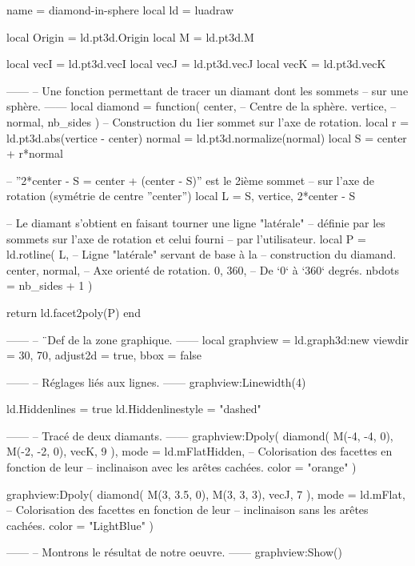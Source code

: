 \documentclass[border = 3pt]{standalone}
\begin{document}
\begin{luadraw*}{name = diamond-in-sphere}
local ld = luadraw

local Origin = ld.pt3d.Origin
local M      = ld.pt3d.M

local vecI = ld.pt3d.vecI
local vecJ = ld.pt3d.vecJ
local vecK = ld.pt3d.vecK

------
-- Une fonction permettant de tracer un diamant dont les sommets
-- sur une sphère.
------
local diamond = function(
  center,   -- Centre de la sphère.
  vertice,  --
  normal,
  nb_sides
)
-- Construction du 1ier sommet sur l'axe de rotation.
  local r = ld.pt3d.abs(vertice - center)
  normal  = ld.pt3d.normalize(normal)
  local S = center + r*normal

-- ''2*center - S = center + (center - S)'' est le 2ième sommet
-- sur l'axe de rotation (symétrie de centre ''center'')
  local L = {S, vertice, 2*center - S}

-- Le diamant s'obtient en faisant tourner une ligne "latérale"
-- définie par les sommets sur l'axe de rotation et celui fourni
-- par l'utilisateur.
  local P = ld.rotline(
    L,                 -- Ligne "latérale" servant de base à la
                       -- construction du diamand.
    {center, normal},  -- Axe orienté de rotation.
    0, 360,            -- De `0` à `360` degrés.
    {nbdots = nb_sides + 1}
  )

  return ld.facet2poly(P)
end

------
-- ¨Def de la zone graphique.
------
local graphview = ld.graph3d:new{
  viewdir  = {30, 70},
  adjust2d = true,
  bbox     = false
}

------
-- Réglages liés aux lignes.
------
graphview:Linewidth(4)

ld.Hiddenlines     = true
ld.Hiddenlinestyle = "dashed"

------
-- Tracé de deux diamants.
------
graphview:Dpoly(
  diamond(
    M(-4, -4, 0), M(-2, -2, 0), vecK,
    9
  ),
  {
    mode  = ld.mFlatHidden,  -- Colorisation des facettes en fonction de leur
                             -- inclinaison avec les arêtes cachées.
    color = "orange"
  }
)

graphview:Dpoly(
  diamond(
    M(3, 3.5, 0), M(3, 3, 3), vecJ,
    7
  ),
  {
    mode  = ld.mFlat,  -- Colorisation des facettes en fonction de leur
                       -- inclinaison sans les arêtes cachées.
    color = "LightBlue"
  }
)

------
-- Montrons le résultat de notre oeuvre.
------
graphview:Show()
\end{luadraw*}
\end{document}
